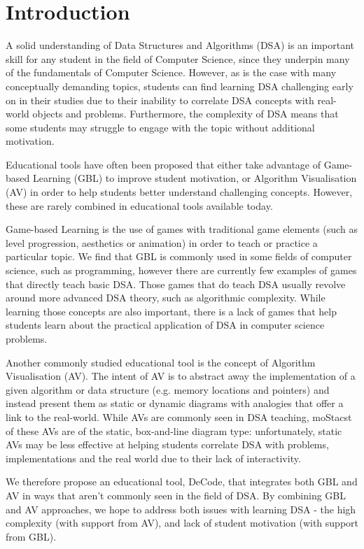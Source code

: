 \documentclass[11pt]{article}
\begin{document}
\section{Introduction}
A solid understanding of Data Structures and Algorithms (DSA) is an important skill for any student in the field of Computer Science, since they underpin many of the fundamentals of Computer Science. However, as is the case with many conceptually demanding topics, students can find learning DSA challenging early on in their studies due to their inability to correlate DSA concepts with real-world objects and problems\cite{7600449}. Furthermore, the complexity of DSA means that some students may struggle to engage with the topic without additional motivation.\par
Educational tools have often been proposed that either take advantage of Game-based Learning (GBL) to improve student motivation, or Algorithm Visualisation (AV) in order to help students better understand challenging concepts. However, these are rarely combined in educational tools available today.\par
Game-based Learning is the use of games with traditional game elements (such as level progression, aesthetics or animation) in order to teach or practice a particular topic\cite{GBLTeaching}. We find that GBL is commonly used in some fields of computer science, such as programming, however there are currently few examples of games that directly teach basic DSA. Those games that do teach DSA usually revolve around more advanced DSA theory, such as algorithmic complexity. While learning those concepts are also important, there is a lack of games that help students learn about the practical application of DSA in computer science problems.\par
Another commonly studied educational tool is the concept of Algorithm Visualisation (AV). The intent of AV is to abstract away the implementation of a given algorithm or data structure (e.g. memory locations and pointers) and instead present them as static or dynamic diagrams with analogies that offer a link to the real-world. While AVs are commonly seen in DSA teaching, moStacst of these AVs are of the static, box-and-line diagram type: unfortunately, static AVs may be less effective at helping students correlate DSA with problems, implementations and the real world due to their lack of interactivity\cite{Esponda-Arguero:2010:TVD:1827707.1827710}.\par
We therefore propose an educational tool, DeCode, that integrates both GBL and AV in ways that aren't commonly seen in the field of DSA. By combining GBL and AV approaches, we hope to address both issues with learning DSA - the high complexity (with support from AV), and lack of student motivation (with support from GBL).\par
\end{document}
